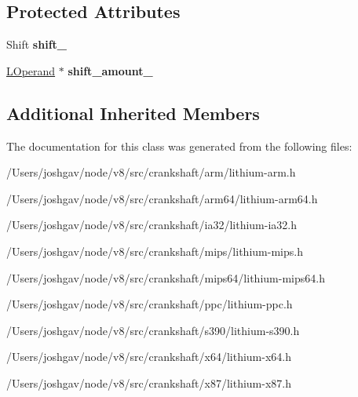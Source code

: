 \subsection*{Protected Attributes}
\begin{DoxyCompactItemize}
\item 
Shift {\bfseries shift\+\_\+}\hypertarget{classv8_1_1internal_1_1_l_sub_i_ad23d16a8fad71fad312d15c114c6e4b5}{}\label{classv8_1_1internal_1_1_l_sub_i_ad23d16a8fad71fad312d15c114c6e4b5}

\item 
\hyperlink{classv8_1_1internal_1_1_l_operand}{L\+Operand} $\ast$ {\bfseries shift\+\_\+amount\+\_\+}\hypertarget{classv8_1_1internal_1_1_l_sub_i_a72769258b6011cc9e5316431e2d694d8}{}\label{classv8_1_1internal_1_1_l_sub_i_a72769258b6011cc9e5316431e2d694d8}

\end{DoxyCompactItemize}
\subsection*{Additional Inherited Members}


The documentation for this class was generated from the following files\+:\begin{DoxyCompactItemize}
\item 
/\+Users/joshgav/node/v8/src/crankshaft/arm/lithium-\/arm.\+h\item 
/\+Users/joshgav/node/v8/src/crankshaft/arm64/lithium-\/arm64.\+h\item 
/\+Users/joshgav/node/v8/src/crankshaft/ia32/lithium-\/ia32.\+h\item 
/\+Users/joshgav/node/v8/src/crankshaft/mips/lithium-\/mips.\+h\item 
/\+Users/joshgav/node/v8/src/crankshaft/mips64/lithium-\/mips64.\+h\item 
/\+Users/joshgav/node/v8/src/crankshaft/ppc/lithium-\/ppc.\+h\item 
/\+Users/joshgav/node/v8/src/crankshaft/s390/lithium-\/s390.\+h\item 
/\+Users/joshgav/node/v8/src/crankshaft/x64/lithium-\/x64.\+h\item 
/\+Users/joshgav/node/v8/src/crankshaft/x87/lithium-\/x87.\+h\end{DoxyCompactItemize}
